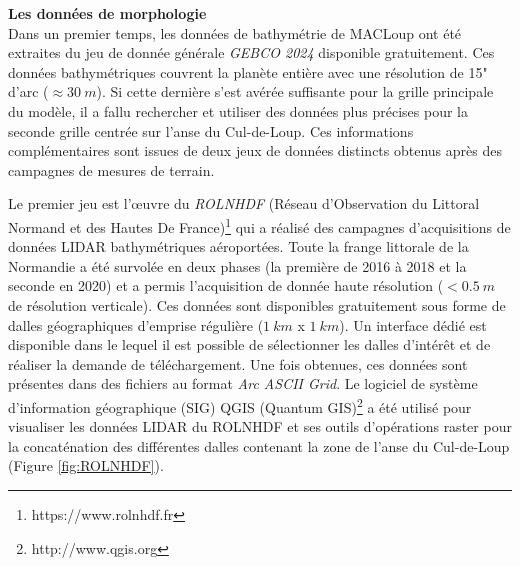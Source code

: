 \documentclass[10pt,a4paper,titlepage]{article}
\begin{document}
\textbf{Les données de morphologie}\\
Dans un premier temps, les données de bathymétrie de MACLoup ont été extraites du jeu de donnée générale \textit{GEBCO 2024} disponible gratuitement.
Ces données bathymétriques couvrent la planète entière avec une résolution de 15" d'arc ($\approx30~m$).
Si cette dernière s'est avérée suffisante pour la grille principale du modèle, il a fallu rechercher et utiliser des données plus précises pour la seconde grille centrée sur l'anse du Cul-de-Loup.
Ces informations complémentaires sont issues de deux jeux de données distincts obtenus après des campagnes de mesures de terrain.

Le premier jeu est l'\oe{}uvre du \textit{ROLNHDF} (Réseau d'Observation du Littoral Normand et des Hautes De France)\footnote{https://www.rolnhdf.fr} qui a réalisé des campagnes d'acquisitions de données LIDAR bathymétriques aéroportées. 
Toute la frange littorale de la Normandie a été survolée en deux phases (la première de 2016 à 2018 et la seconde en 2020) et a permis l'acquisition de donnée haute résolution ($<0.5~m$ de résolution verticale). 
Ces données sont disponibles gratuitement sous forme de dalles géographiques d'emprise régulière ($1~km$ x $1~km$). 
Un interface dédié est disponible dans le lequel il est possible de sélectionner les dalles d'intérêt et de réaliser la demande de téléchargement. 
Une fois obtenues, ces données sont présentes dans des fichiers au format \textit{Arc ASCII Grid}. 
Le logiciel de système d'information géographique (SIG) QGIS (Quantum GIS)\footnote{http://www.qgis.org} a été utilisé pour visualiser les données LIDAR du ROLNHDF et ses outils d'opérations raster pour la concaténation des différentes dalles contenant la zone de l'anse du Cul-de-Loup (Figure \ref{fig:ROLNHDF}).
\end{document}
